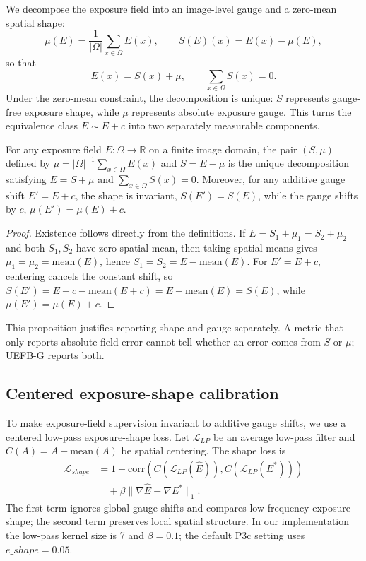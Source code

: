 We decompose the exposure field into an image-level gauge and a zero-mean spatial shape:
\begin{equation}
\mu(E) = \frac{1}{|\Omega|}\sum_{x\in\Omega} E(x), \qquad
S(E)(x) = E(x) - \mu(E),
\end{equation}
so that
\begin{equation}
E(x) = S(x) + \mu, \qquad \sum_{x\in\Omega} S(x)=0.
\end{equation}
Under the zero-mean constraint, the decomposition is unique: $S$ represents gauge-free exposure shape, while $\mu$ represents absolute exposure gauge. This turns the equivalence class $E \sim E+c$ into two separately measurable components.

\begin{proposition}
For any exposure field $E:\Omega\rightarrow\mathbb{R}$ on a finite image domain, the pair $(S,\mu)$ defined by $\mu=|\Omega|^{-1}\sum_{x\in\Omega}E(x)$ and $S=E-\mu$ is the unique decomposition satisfying $E=S+\mu$ and $\sum_{x\in\Omega}S(x)=0$. Moreover, for any additive gauge shift $E'=E+c$, the shape is invariant, $S(E')=S(E)$, while the gauge shifts by $c$, $\mu(E')=\mu(E)+c$.
\end{proposition}
\begin{proof}
Existence follows directly from the definitions. If $E=S_1+\mu_1=S_2+\mu_2$ and both $S_1,S_2$ have zero spatial mean, then taking spatial means gives $\mu_1=\mu_2=\mathrm{mean}(E)$, hence $S_1=S_2=E-\mathrm{mean}(E)$. For $E'=E+c$, centering cancels the constant shift, so $S(E')=E+c-\mathrm{mean}(E+c)=E-\mathrm{mean}(E)=S(E)$, while $\mu(E')=\mu(E)+c$.
\end{proof}

This proposition justifies reporting shape and gauge separately. A metric that only reports absolute field error cannot tell whether an error comes from $S$ or $\mu$; UEFB-G reports both.

\subsection{Centered exposure-shape calibration}

To make exposure-field supervision invariant to additive gauge shifts, we use a centered low-pass exposure-shape loss. Let $\mathcal{L}_{LP}$ be an average low-pass filter and $C(A)=A-\mathrm{mean}(A)$ be spatial centering. The shape loss is
\begin{align}
\mathcal{L}_{shape} &= 1 - \mathrm{corr}\left(C(\mathcal{L}_{LP}(\hat{E})), C(\mathcal{L}_{LP}(E^*))\right) \\
&\quad + \beta \|\nabla \hat{E} - \nabla E^*\|_1 .
\end{align}
The first term ignores global gauge shifts and compares low-frequency exposure shape; the second term preserves local spatial structure. In our implementation the low-pass kernel size is 7 and $\beta=0.1$; the default P3c setting uses $e\_shape=0.05$.

